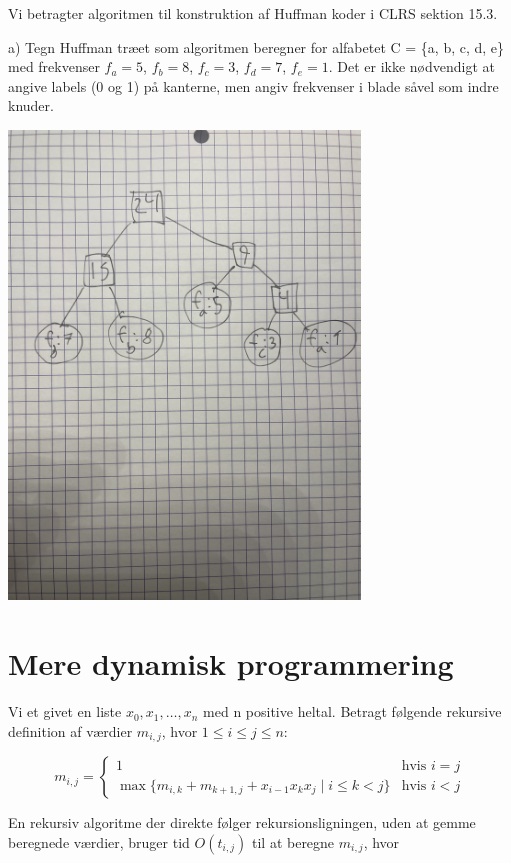 \documentclass[12pt,a4paper]{article}
\begin{document}
Vi betragter algoritmen til konstruktion af Huffman koder i CLRS sektion 15.3.

a) Tegn Huffman træet som algoritmen beregner for alfabetet C = \{a, b, c, d, e\} med frekvenser $f_a = 5$, $f_b = 8$, $f_c = 3$, $f_d = 7$, $f_e = 1$. Det er ikke nødvendigt at angive labels (0 og 1) på kanterne, men angiv frekvenser i blade såvel som indre knuder.


\includegraphics[width=0.7\textwidth]{IMG_9968.jpeg}

\section{Mere dynamisk programmering}

Vi et givet en liste $x_0, x_1, \ldots, x_n$ med n positive heltal. Betragt følgende rekursive definition af værdier $m_{i,j}$, hvor $1 \leq i \leq j \leq n$:

\[m_{i,j} = \begin{cases} 
1 & \text{hvis } i = j\\
\max\{m_{i,k} + m_{k+1,j} + x_{i-1}x_kx_j \mid i \leq k < j\} & \text{hvis } i < j
\end{cases}\]

En rekursiv algoritme der direkte følger rekursionsligningen, uden at gemme beregnede værdier, bruger tid $O(t_{i,j})$ til at beregne $m_{i,j}$, hvor
\end{document}
